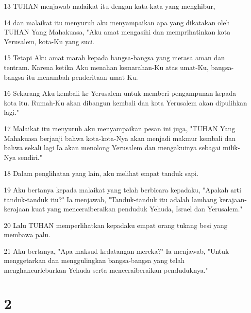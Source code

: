 \par 13 TUHAN menjawab malaikat itu dengan kata-kata yang menghibur,
\par 14 dan malaikat itu menyuruh aku menyampaikan apa yang dikatakan oleh TUHAN Yang Mahakuasa, "Aku amat mengasihi dan memprihatinkan kota Yerusalem, kota-Ku yang suci.
\par 15 Tetapi Aku amat marah kepada bangsa-bangsa yang merasa aman dan tentram. Karena ketika Aku menahan kemarahan-Ku atas umat-Ku, bangsa-bangsa itu menambah penderitaan umat-Ku.
\par 16 Sekarang Aku kembali ke Yerusalem untuk memberi pengampunan kepada kota itu. Rumah-Ku akan dibangun kembali dan kota Yerusalem akan dipulihkan lagi."
\par 17 Malaikat itu menyuruh aku menyampaikan pesan ini juga, "TUHAN Yang Mahakuasa berjanji bahwa kota-kota-Nya akan menjadi makmur kembali dan bahwa sekali lagi Ia akan menolong Yerusalem dan mengakuinya sebagai milik-Nya sendiri."
\par 18 Dalam penglihatan yang lain, aku melihat empat tanduk sapi.
\par 19 Aku bertanya kepada malaikat yang telah berbicara kepadaku, "Apakah arti tanduk-tanduk itu?" Ia menjawab, "Tanduk-tanduk itu adalah lambang kerajaan-kerajaan kuat yang menceraiberaikan penduduk Yehuda, Israel dan Yerusalem."
\par 20 Lalu TUHAN memperlihatkan kepadaku empat orang tukang besi yang membawa palu.
\par 21 Aku bertanya, "Apa maksud kedatangan mereka?" Ia menjawab, "Untuk menggetarkan dan menggulingkan bangsa-bangsa yang telah menghancurleburkan Yehuda serta menceraiberaikan penduduknya."

\chapter{2}

